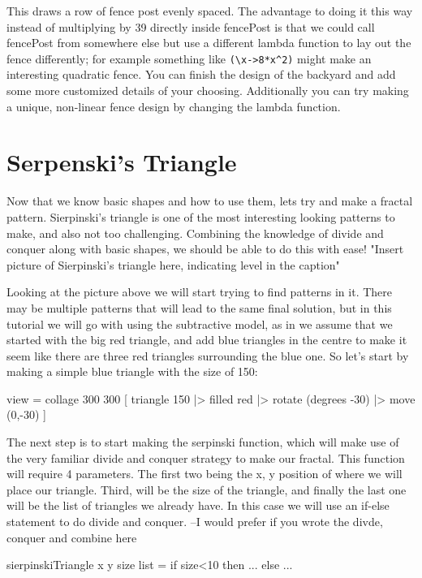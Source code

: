 \documentclass[12pt]{amsbook}
\begin{document}
This draws a row of fence post evenly spaced. The advantage to doing it this way instead of multiplying by 39 directly inside fencePost is that we could call fencePost from somewhere else but use a different lambda function to lay out the fence differently; for example something like \verb|(\x->8*x^2)| might make an interesting quadratic fence. You can finish the design of the backyard and add some more customized details of your choosing. Additionally you can try making a unique, non-linear fence design by changing the lambda function. 

\section{Serpenski's Triangle}

Now that we know basic shapes and how to use them, lets try and make a fractal pattern. Sierpinski's triangle is one of the most interesting looking patterns to make, and also not too challenging. Combining the knowledge of divide and conquer along with basic shapes, we should be able to do this with ease!
	"Insert picture of Sierpinski's triangle here, indicating level in the caption"

Looking at the picture above we will start trying to find patterns in it. There may be multiple patterns that will lead to the same final solution, but in this tutorial we will go with using the subtractive model, as in we assume that we started with the big red triangle, and add blue triangles in the centre to make it seem like there are three red triangles surrounding the blue one. So let's start by making a simple blue triangle with the size of 150:

\begin{code}
view = collage 300 300 [
                        triangle 150
                            |> filled red
                            |> rotate (degrees -30)
                            |> move (0,-30)
                       ]
\end{code}
The next step is to start making the serpinski function, which will make use of the very familiar divide and conquer strategy to make our fractal. This function will require 4 parameters. The first two being the x, y position of where we will place our triangle. Third, will be the size of the triangle, and finally the last one will be the list of triangles we already have. In this case we will use an if-else statement to do divide and conquer.
					--I would prefer if you wrote the divde, conquer and combine here
\begin{code}
sierpinskiTriangle x y size list = 
    if size<10 then
	        ...	
	else 
	        ...
\end{code}
\end{document}
